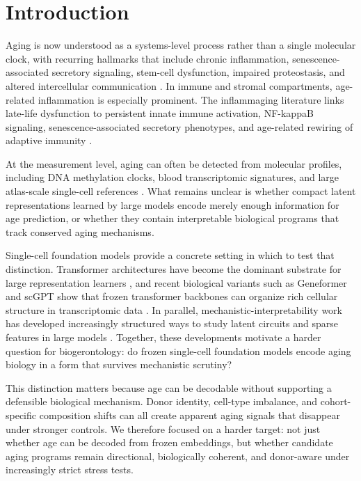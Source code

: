 \documentclass[11pt]{article}
\begin{document}
\section{Introduction}
Aging is now understood as a systems-level process rather than a single molecular clock, with recurring hallmarks that include chronic inflammation, senescence-associated secretory signaling, stem-cell dysfunction, impaired proteostasis, and altered intercellular communication \citep{lopez2013hallmarks,lopez2023hallmarks,kennedy2014geroscience,campisi2019therapeutics}. In immune and stromal compartments, age-related inflammation is especially prominent. The inflammaging literature links late-life dysfunction to persistent innate immune activation, NF-kappaB signaling, senescence-associated secretory phenotypes, and age-related rewiring of adaptive immunity \citep{franceschi2000inflammaging,fabbri2014chronic,furman2019chronic,ferrucci2018inflammageing,nikolich2018twilight,goronzy2019tcell,salminen2008nfkb,chien2011sasp,hernandez2018senescence,basisty2020secretome,zhang2013hypothalamic}.

At the measurement level, aging can often be detected from molecular profiles, including DNA methylation clocks, blood transcriptomic signatures, and large atlas-scale single-cell references \citep{horvath2013age,lu2019grimage,peters2015bloodage,tabulamuris2020,schaum2020hallmarks,tabula2022,yazar2022}. What remains unclear is whether compact latent representations learned by large models encode merely enough information for age prediction, or whether they contain interpretable biological programs that track conserved aging mechanisms.

Single-cell foundation models provide a concrete setting in which to test that distinction. Transformer architectures have become the dominant substrate for large representation learners \citep{vaswani2017attention}, and recent biological variants such as Geneformer and scGPT show that frozen transformer backbones can organize rich cellular structure in transcriptomic data \citep{theodoris2023geneformer,cui2024scgpt}. In parallel, mechanistic-interpretability work has developed increasingly structured ways to study latent circuits and sparse features in large models \citep{olah2020circuits,bau2017network,bricken2023monosemanticity,templeton2024scaling}. Together, these developments motivate a harder question for biogerontology: do frozen single-cell foundation models encode aging biology in a form that survives mechanistic scrutiny?

This distinction matters because age can be decodable without supporting a defensible biological mechanism. Donor identity, cell-type imbalance, and cohort-specific composition shifts can all create apparent aging signals that disappear under stronger controls. We therefore focused on a harder target: not just whether age can be decoded from frozen embeddings, but whether candidate aging programs remain directional, biologically coherent, and donor-aware under increasingly strict stress tests.
\end{document}
